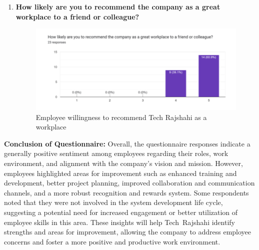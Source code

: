 \documentclass[12pt,a4paper]{article}
\begin{document}
\begin{enumerate}
    \item \textbf{How likely are you to recommend the company as a great workplace to a friend or colleague?}  
    \begin{figure}[H]
        \centering
        \includegraphics[width=\textwidth]{Fig/work.png}
        \caption{Employee willingness to recommend Tech Rajshahi as a workplace}
        \label{fig:recommendation}
    \end{figure}
\end{enumerate}

\textbf{Conclusion of Questionnaire:}  Overall, the questionnaire responses indicate a generally positive sentiment among employees regarding their roles, work environment, and alignment with the company’s vision and mission.  However, employees highlighted areas for improvement such as enhanced training and development, better project planning, improved collaboration and communication channels, and a more robust recognition and rewards system.  Some respondents noted that they were not involved in the system development life cycle, suggesting a potential need for increased engagement or better utilization of employee skills in this area.  These insights will help Tech Rajshahi identify strengths and areas for improvement, allowing the company to address employee concerns and foster a more positive and productive work environment.
\end{document}
